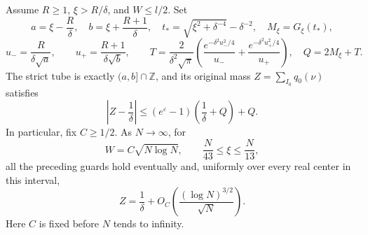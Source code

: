 \begin{proposition}
\label{prop:Mazur-tube-mass}
Assume $R\ge1$, $\xi>R/\delta$, and $W\le l/2$. Set
\[
 a=\xi-\frac R\delta,\quad b=\xi+\frac{R+1}{\delta},\quad
 t_*=\sqrt{\xi^2+\delta^{-4}}-\delta^{-2},\quad
 M_\xi=G_\xi(t_*),
\]
\[
 u_-=\frac{R}{\delta\sqrt a},\qquad
 u_+=\frac{R+1}{\delta\sqrt b},\qquad
 T=\frac{2}{\delta^2\sqrt\pi}
   \left(\frac{e^{-\delta^2u_-^2/4}}{u_-}
              +\frac{e^{-\delta^2u_+^2/4}}{u_+}\right),\quad
 Q=2M_\xi+T.
\]
The strict tube is exactly $(a,b]\cap\mathbb Z$, and its original
mass $Z=\sum_{I_0}q_0(\nu)$ satisfies
\begin{equation}
 \left|Z-\frac1\delta\right|
 \le (e^\varepsilon-1)\left(\frac1\delta+Q\right)+Q.
 \label{eq:Mazur-finite-mass}
\end{equation}
In particular, fix $C\ge1/2$. As $N\to\infty$, for
\[
 W=C\sqrt{N\log N},\qquad \frac N{43}\le\xi\le\frac N{13},
\]
all the preceding guards hold eventually and, uniformly over every
real center in this interval,
\begin{equation}
 Z=\frac1\delta+
 O_C\!\left(\frac{(\log N)^{3/2}}{\sqrt N}\right).
 \label{eq:Mazur-mass-asymptotic}
\end{equation}
Here $C$ is fixed before $N$ tends to infinity.
\end{proposition}
